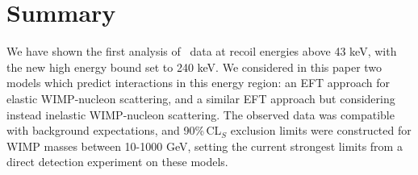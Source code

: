 \section{Summary}
We have shown the first analysis of \Xehund\ data at recoil energies above 43 keV, with the new high energy bound set to 240 keV. We considered in this paper two models which predict interactions in this energy region: an EFT approach for elastic WIMP-nucleon scattering, and a similar EFT approach but considering instead inelastic WIMP-nucleon scattering. The observed data was compatible with background expectations, and 90\%\,CL$_S$ exclusion limits were constructed for WIMP masses between 10-1000 GeV, setting the current strongest limits from a direct detection experiment on these models.
